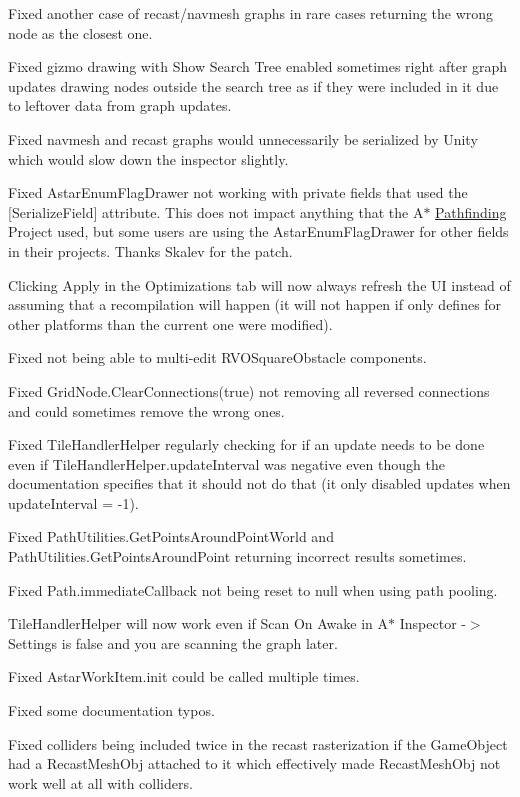\begin{DoxyItemize}
\begin{DoxyItemize}
\begin{DoxyItemize}
\item Fixed another case of recast/navmesh graphs in rare cases returning the wrong node as the closest one.
\item Fixed gizmo drawing with \textquotesingle{}Show Search Tree\textquotesingle{} enabled sometimes right after graph updates drawing nodes outside the search tree as if they were included in it due to leftover data from graph updates.
\item Fixed navmesh and recast graphs would unnecessarily be serialized by Unity which would slow down the inspector slightly.
\item Fixed Astar\+Enum\+Flag\+Drawer not working with private fields that used the \mbox{[}Serialize\+Field\mbox{]} attribute. This does not impact anything that the A$\ast$ \mbox{\hyperlink{namespace_pathfinding}{Pathfinding}} Project used, but some users are using the Astar\+Enum\+Flag\+Drawer for other fields in their projects. Thanks Skalev for the patch.
\item Clicking \textquotesingle{}Apply\textquotesingle{} in the Optimizations tab will now always refresh the UI instead of assuming that a recompilation will happen (it will not happen if only defines for other platforms than the current one were modified).
\item Fixed not being able to multi-\/edit R\+V\+O\+Square\+Obstacle components.
\item Fixed Grid\+Node.\+Clear\+Connections(true) not removing all reversed connections and could sometimes remove the wrong ones.
\item Fixed Tile\+Handler\+Helper regularly checking for if an update needs to be done even if Tile\+Handler\+Helper.\+update\+Interval was negative even though the documentation specifies that it should not do that (it only disabled updates when update\+Interval = -\/1).
\item Fixed Path\+Utilities.\+Get\+Points\+Around\+Point\+World and Path\+Utilities.\+Get\+Points\+Around\+Point returning incorrect results sometimes.
\item Fixed Path.\+immediate\+Callback not being reset to null when using path pooling.
\item Tile\+Handler\+Helper will now work even if Scan On Awake in A$\ast$ Inspector -\/$>$ Settings is false and you are scanning the graph later.
\item Fixed Astar\+Work\+Item.\+init could be called multiple times.
\item Fixed some documentation typos.
\item Fixed colliders being included twice in the recast rasterization if the Game\+Object had a Recast\+Mesh\+Obj attached to it which effectively made Recast\+Mesh\+Obj not work well at all with colliders.

\end{DoxyItemize}
\end{DoxyItemize}
\end{DoxyItemize}
